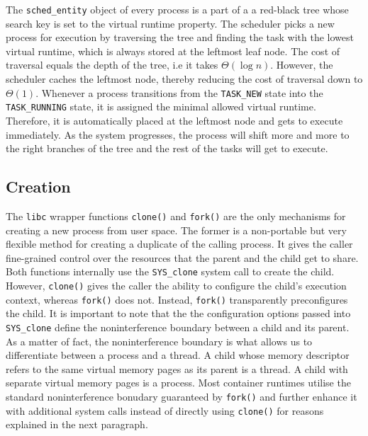 The \verb|sched_entity| object of every process is a part of a 
a red-black tree whose search key is set to the virtual runtime property. The scheduler picks a new process 
for execution by traversing the tree and finding the task with the lowest virtual runtime, which is always 
stored at the leftmost leaf node. The cost of traversal equals the depth of the tree, i.e it takes $\Theta{(\log{n})}$.
However, the scheduler caches the leftmost node, thereby reducing the cost of traversal down to $\Theta{(1)}$.
Whenever a process transitions from the \verb|TASK_NEW| state into the \verb|TASK_RUNNING| state, 
it is assigned the minimal allowed virtual runtime. Therefore, it is automatically 
placed at the leftmost node and gets to execute immediately. As the system progresses, the process will
shift more and more to the right branches of the tree and the rest of the tasks will get to execute.

\subsection{Creation}
\label{ch:fundamentals/processes/creation}
The \verb|libc| wrapper functions \verb|clone()| and \verb|fork()| are the only mechanisms for 
creating a new process from user space. The former is a non-portable but very flexible method for creating a
duplicate of the calling process. It gives the caller fine-grained control over the resources that 
the parent and the child get to share. Both functions internally use the \verb|SYS_clone| system call 
to create the child. However, \verb|clone()| gives the caller the ability to configure the child's execution 
context, whereas \verb|fork()| does not. Instead, \verb|fork()| transparently preconfigures the child.
It is important to note that the the configuration options passed into \verb|SYS_clone| define 
the noninterference boundary between a child and its parent. As a matter of fact, the 
noninterference boundary is what allows us to differentiate between a process and a thread. 
A child whose memory descriptor refers to the same virtual memory pages as its parent is a thread. 
A child with separate virtual memory pages is a process. Most container runtimes utilise 
the standard noninterference bonudary guaranteed by \verb|fork()| and further enhance it 
with additional system calls instead of directly using \verb|clone()| for reasons explained 
in the next paragraph. 

